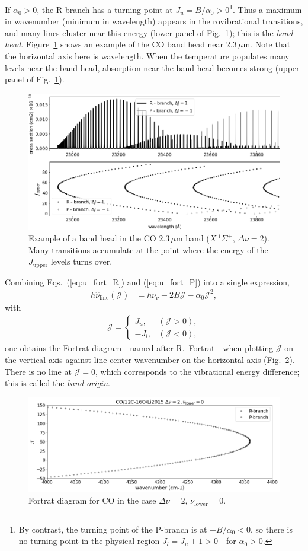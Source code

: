 If $\alpha_0 > 0$, the R-branch has a turning point at $J_u = B/\alpha_0 > 0$\footnote{By contrast, the turning point of the P-branch is at $- B/\alpha_0 < 0$, so there is no turning point in the physical region $J_l = J_u + 1 > 0$—for $\alpha_0>0$.}. Thus a maximum in wavenumber (minimum in wavelength) appears in the rovibrational transitions, and many lines cluster near this energy (lower panel of Fig.~\ref{fig:rpbranch}); this is the \emph{band head}. Figure~\ref{fig:rpbranch} shows an example of the CO band head near $2.3\,\mu$m. Note that the horizontal axis here is wavelength. When the temperature populates many levels near the band head, absorption near the band head becomes strong (upper panel of Fig.~\ref{fig:rpbranch}).

\begin{figure}
    \centering
    \includegraphics[width=0.9\linewidth]{fig/bandhead.png}
    \caption{Example of a band head in the CO $2.3\,\mu$m band ($X\,^1 \Sigma^+$, $\Delta \nu = 2$). Many transitions accumulate at the point where the energy of the $J_\mathrm{upper}$ levels turns over.}
    \label{fig:rpbranch}
\end{figure}

Combining Eqs.~(\ref{eq:u_fort_R}) and (\ref{eq:u_fort_P}) into a single expression,
\begin{align}
h \hat{\nu}_{\mathrm{line}} (\mathcal{J}) &=  h \nu_\nu - 2 B \mathcal{J} - \alpha_0 \mathcal{J}^2,
\end{align}
with
\begin{align}
\mathcal{J} =
\begin{cases}
 J_u, & (\mathcal{J} > 0),\\
 - J_l, & (\mathcal{J} < 0),
\end{cases}
\end{align}
one obtains the Fortrat diagram—named after R.~Fortrat—when plotting $\mathcal{J}$ on the vertical axis against line-center wavenumber on the horizontal axis (Fig.~\ref{fig:fortrat}). There is no line at $\mathcal{J}=0$, which corresponds to the vibrational energy difference; this is called the \emph{band origin}.

\begin{figure}
    \centering
    \includegraphics[width=0.9\linewidth]{fig/fortrat.png}
    \caption{Fortrat diagram for CO in the case $\Delta \nu=2$, $\nu_\mathrm{lower}=0$.}
    \label{fig:fortrat}
\end{figure}
